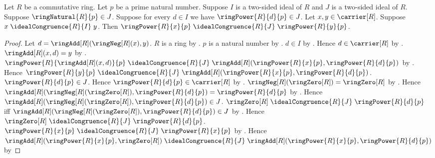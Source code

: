 \begin{theorem}\label{prime_power_ideal_congruence}
    Let $R$ be a commutative ring.
    Let $p$ be a prime natural number.
    Suppose $I$ is a two-sided ideal of $R$ and
        $J$ is a two-sided ideal of $R$.
    Suppose $\ringNatural{R}{p}\in J$.
    Suppose for every $d\in I$ we have
        $\ringPower{R}{d}{p}\in J$.
    Let $x,y\in\carrier[R]$.
    Suppose $x\mathrel{\idealCongruence{R}{I}}y$.
    Then
        $\ringPower{R}{x}{p}
            \mathrel{\idealCongruence{R}{J}}
        \ringPower{R}{y}{p}$.
\end{theorem}
\begin{proof}
    Let $d=\ringAdd[R](\ringNeg[R](x),y)$.
    $R$ is a ring by .
    $p$ is a natural number by .
    $d\in I$ by .
    Hence $d\in\carrier[R]$ by
        .
    $\ringAdd[R](x,d)=y$ by
        .
    $\ringPower{R}{\ringAdd[R](x,d)}{p}
        \mathrel{\idealCongruence{R}{J}}
        \ringAdd[R](\ringPower{R}{x}{p},\ringPower{R}{d}{p})$ by
        .
    Hence $\ringPower{R}{y}{p}
        \mathrel{\idealCongruence{R}{J}}
        \ringAdd[R](\ringPower{R}{x}{p},\ringPower{R}{d}{p})$.
    $\ringPower{R}{d}{p}\in J$.
    Hence $\ringPower{R}{d}{p}\in\carrier[R]$ by
        .
    $\ringNeg[R](\ringZero[R])=\ringZero[R]$ by
        .
    Hence $\ringAdd[R](\ringNeg[R](\ringZero[R]),
        \ringPower{R}{d}{p})=\ringPower{R}{d}{p}$ by
        .
    Hence $\ringAdd[R](\ringNeg[R](\ringZero[R]),
        \ringPower{R}{d}{p})\in J$.
    $\ringZero[R]\mathrel{\idealCongruence{R}{J}}
        \ringPower{R}{d}{p}$ iff
        $\ringAdd[R](\ringNeg[R](\ringZero[R]),
            \ringPower{R}{d}{p})\in J$ by
        .
    Hence
        $\ringZero[R]\mathrel{\idealCongruence{R}{J}}
            \ringPower{R}{d}{p}$.
    $\ringPower{R}{x}{p}
        \mathrel{\idealCongruence{R}{J}}
        \ringPower{R}{x}{p}$ by
        .
    Hence
        $\ringAdd[R](\ringPower{R}{x}{p},\ringZero[R])
            \mathrel{\idealCongruence{R}{J}}
        \ringAdd[R](\ringPower{R}{x}{p},\ringPower{R}{d}{p})$ by
\end{proof}
